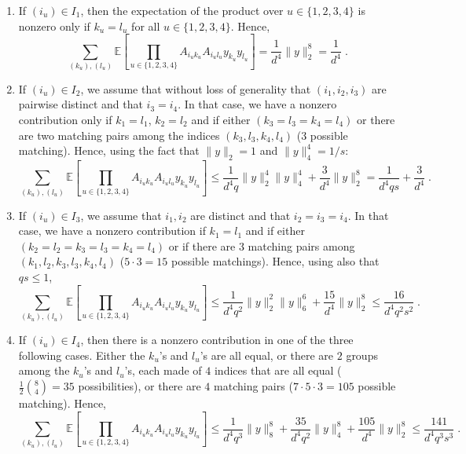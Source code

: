 \documentclass{ps}
\newcommand{\E}{\mathbb{E}}
\newcommand{\1}{\mathbbm{1}}
\theoremstyle{plain}
\begin{document}
\begin{enumerate}
	\item If $(i_u) \in I_1$, then the expectation of the product over $u \in \{1,2,3,4\}$ is nonzero only if $k_u = l_u$ for all $u \in \{1,2,3,4\}$. Hence,
	\begin{equation*}
		\sum_{(k_u), (l_u)} \E\left[\prod_{u \in \{1, 2, 3, 4\}} A_{{i_u}{k_u}}A_{{i_u}{l_u}}y_{k_u}y_{l_u}\right] = \frac{1}{d^4} \|y\|^8_2 = \frac{1}{d^4} \; .
	\end{equation*}
	\item If $(i_u) \in I_2$, we assume that without loss of generality that $(i_1,i_2,i_3)$ are pairwise distinct and that $i_3 = i_4$. In that case, we have a nonzero contribution only if $k_1= l_1$, $k_2 = l_2$ and if either $(k_3=l_3=k_4=l_4)$ or there are two matching pairs among the indices $(k_3,l_3,k_4,l_4)$ (3 possible matching). Hence, using the fact that $\|y\|_2 = 1$ and $\|y\|_4^4=1/s$:
	\begin{equation*}
		\sum_{(k_u), (l_u)} \E\left[\prod_{u \in \{1, 2, 3, 4\}} A_{{i_u}{k_u}}A_{{i_u}{l_u}}y_{k_u}y_{l_u}\right] \leq \frac{1}{d^4q}\|y\|_2^4\|y\|_4^4 + \frac{3}{d^4} \|y\|^8_2 = \frac{1}{d^4qs} + \frac{3}{d^4}\; .
	\end{equation*}
	\item If $(i_u) \in I_3$, we assume that $i_1, i_2$ are distinct and that $i_2=i_3=i_4$. In that case, we have a nonzero contribution if $k_1 = l_1$ and if either $(k_2=l_2=k_3=l_3=k_4=l_4)$ or if there are $3$ matching pairs among $(k_1, l_2, k_3, l_3, k_4, l_4)$ ($5\cdot 3=15$ possible matchings). Hence, using also that $qs \leq 1$,
	\begin{equation*}
		\sum_{(k_u), (l_u)} \E\left[\prod_{u \in \{1, 2, 3, 4\}} A_{{i_u}{k_u}}A_{{i_u}{l_u}}y_{k_u}y_{l_u}\right] \leq \frac{1}{d^4q^2}\|y\|_2^2\|y\|_6^6 + \frac{15}{d^4} \|y\|^8_2 \leq \frac{16}{d^4q^2s^2} \; .
	\end{equation*}

	\item If $(i_u) \in I_4$, then there is a nonzero contribution in one of the three following cases. Either the $k_u$'s and $l_u$'s are all equal, or there are $2$ groups among the $k_u$'s and $l_u$'s, each made of $4$ indices  that are all equal ($\tfrac{1}{2}\binom{8}{4} = 35$ possibilities), or there are $4$ matching pairs ($7\cdot5\cdot3 = 105$ possible matching). Hence,
	\begin{equation*}
		\sum_{(k_u), (l_u)} \E\left[\prod_{u \in \{1, 2, 3, 4\}} A_{{i_u}{k_u}}A_{{i_u}{l_u}}y_{k_u}y_{l_u}\right] \leq \frac{1}{d^4q^3}\|y\|_8^8 + \frac{35}{d^4q^2} \|y\|_4^8 + \frac{105}{d^4} \|y\|_2^8 \leq \frac{141}{d^4q^3s^3} \; .
	\end{equation*}


\end{enumerate}
\end{document}
